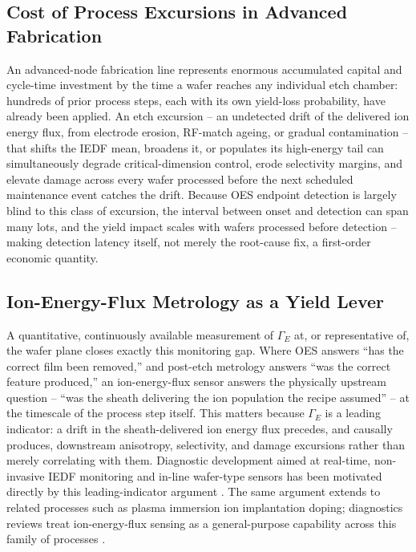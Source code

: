 \subsection{Cost of Process Excursions in Advanced Fabrication}

An advanced-node fabrication line represents enormous accumulated capital and cycle-time investment by the time a wafer reaches any individual etch chamber: hundreds of prior process steps, each with its own yield-loss probability, have already been applied. An etch excursion -- an undetected drift of the delivered ion energy flux, from electrode erosion, RF-match ageing, or gradual contamination -- that shifts the IEDF mean, broadens it, or populates its high-energy tail can simultaneously degrade critical-dimension control, erode selectivity margins, and elevate damage across every wafer processed before the next scheduled maintenance event catches the drift. Because OES endpoint detection is largely blind to this class of excursion, the interval between onset and detection can span many lots, and the yield impact scales with wafers processed before detection -- making detection latency itself, not merely the root-cause fix, a first-order economic quantity.

\subsection{Ion-Energy-Flux Metrology as a Yield Lever}

A quantitative, continuously available measurement of $\Gamma_{E}$ at, or representative of, the wafer plane closes exactly this monitoring gap. Where OES answers ``has the correct film been removed,'' and post-etch metrology answers ``was the correct feature produced,'' an ion-energy-flux sensor answers the physically upstream question -- ``was the sheath delivering the ion population the recipe assumed'' -- at the timescale of the process step itself. This matters because $\Gamma_{E}$ is a leading indicator: a drift in the sheath-delivered ion energy flux precedes, and causally produces, downstream anisotropy, selectivity, and damage excursions rather than merely correlating with them. Diagnostic development aimed at real-time, non-invasive IEDF monitoring and in-line wafer-type sensors has been motivated directly by this leading-indicator argument \cite{ref0539,ref0541}. The same argument extends to related processes such as plasma immersion ion implantation doping; diagnostics reviews treat ion-energy-flux sensing as a general-purpose capability across this family of processes \cite{ref0553,ref0556}.

